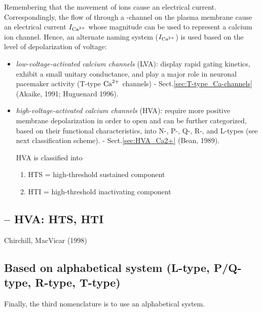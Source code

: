 Remembering that the movement of ions cause an electrical current.
Correspondingly, the flow of  through a -channel on the
plasma membrane cause an electrical current $I_{{\text{Ca}^{2+}}}$ whose magnitude can be used
to represent a calcium ion channel. Hence, an alternate naming system ($I_{{\text{Ca}^{2+}}}$)
is used based on the level of depolarization of voltage:
\begin{itemize}
  
  \item  {\it low-voltage-activated calcium channels} (LVA): display rapid
  gating kinetics, exhibit a small unitary conductance, and play a major role in
  neuronal pacemaker activity (T-type ${\text{Ca}^{2+}}$ channels) -
  Sect.\ref{sec:T-type_Ca-channels} (Akaike, 1991; Huguenard 1996).

  \item {\it high-voltage-activated calcium channels} (HVA): require more
  positive membrane depolarization in order to open and can be further
  categorized, based on their functional characteristics, into N-, P-, Q-, R-,
  and L-types (see next classification scheme). - Sect.\ref{sec:HVA_Ca2+} (Bean,
  1989).

HVA is classified into 
\begin{enumerate}
  \item HTS = high-threshold sustained component
  
  \item HTI = high-threshold inactivating component
\end{enumerate}


\end{itemize}

\subsection{-- HVA: HTS, HTI}
\label{sec:HTS-HVA-Ca2+-current}
\label{sec:HTI-HVA-Ca2+-current}

Chirchill, MacVicar (1998) 

\subsection{Based on alphabetical system (L-type, P/Q-type, R-type, T-type)}
\label{sec:calcium-channels-classification-alphabet}
\label{sec:L-type-Ca2+}
\label{sec:P/Q-type-Ca2+}
\label{sec:T-type-Ca2+}
\label{sec:CaL-type}

Finally, the third nomenclature is to use an alphabetical system.

